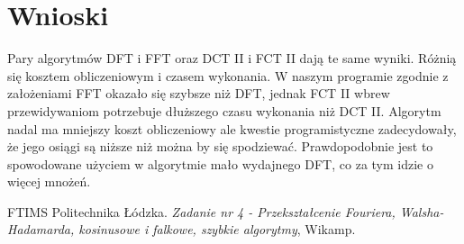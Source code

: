 \documentclass[12pt]{article}
\begin{document}

\section{Wnioski}
Pary algorytmów DFT i FFT oraz DCT II i FCT II dają te same wyniki. Różnią się kosztem obliczeniowym i czasem wykonania. W naszym programie zgodnie z założeniami FFT okazało się szybsze niż DFT, jednak FCT II wbrew przewidywaniom potrzebuje dłuższego czasu wykonania niż DCT II. Algorytm nadal ma mniejszy koszt obliczeniowy ale kwestie programistyczne zadecydowały, że jego osiągi są niższe niż można by się spodziewać. Prawdopodobnie jest to spowodowane użyciem w algorytmie mało wydajnego DFT, co za tym idzie o więcej mnożeń.

\begin{thebibliography}{0}
  FTIMS Politechnika Łódzka.
    \textsl{Zadanie nr 4 - Przekształcenie Fouriera, Walsha-Hadamarda, kosinusowe i falkowe, szybkie algorytmy}, Wikamp.
\end{thebibliography}
\end{document}
